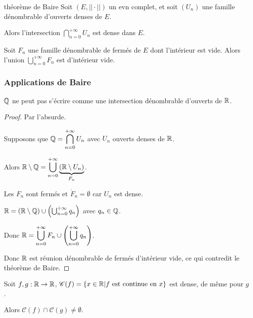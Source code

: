 
\begin{theoreme}{théorème de Baire}{}
    Soit $(E, ||\cdot||)$ un evn complet, et soit $(U_n)$ une famille dénombrable d'ouverts denses de $E$.

    Alors l'intersection $\displaystyle \bigcap_{n=0}^{+\infty} U_n$ est dense dans $E$.

    Soit $F_n$ une famille dénombrable de fermés de $E$ dont l'intérieur est vide. 
    Alors l'union $\displaystyle \bigcup_{n=0}^{+\infty} F_n$ est d'intérieur vide. 
    
\end{theoreme}

\subsubsection{Applications de Baire }

\begin{proposition}{}{}
    $\mathbb{Q}$ ne peut pas s'écrire comme une intersection dénombrable d'ouverts de $\mathbb{R}$.
\end{proposition}

\begin{proof}
    Par l'absurde.

    Supposons que $\mathbb{Q} = \displaystyle \bigcap_{n=0}^{+\infty} U_n$ avec $U_n$ ouverts denses de $\mathbb{R}$.

    Alors $\mathbb{R} \setminus \mathbb{Q} = \displaystyle \bigcup_{n=0}^{+\infty} \underbrace{(\mathbb{R} \setminus U_n)}_{F_n}$. 

    Les $F_n$ sont fermés et $\mathring F_n = \emptyset$ car $U_n$ est dense.

    $\mathbb{R} = (\mathbb{R} \setminus \mathbb{Q}) \cup \left( \bigcup_{n=0}^{+\infty} {q_n} \right)$ avec $q_n \in \mathbb{Q}$.

    Donc $\mathbb{R} = \displaystyle \bigcup_{n=0}^{+\infty} F_n \cup \left( \bigcup_{n=0}^{+\infty} {q_n} \right)$.

    Donc $\mathbb{R}$ est réunion dénombrable de fermés d'intérieur vide, ce qui contredit le théorème de Baire.

\end{proof}

\begin{proposition}{}{}
    Soit $f, g : \mathbb{R} \to \mathbb{R}$, $\mathscr C(f) = \{ x \in \mathbb{R} | f \text{ est continue en } x \}$ est dense, 
    de même pour $g$.

    Alors $\mathscr C(f) \cap \mathscr C(g) \neq \emptyset$. 
\end{proposition}

